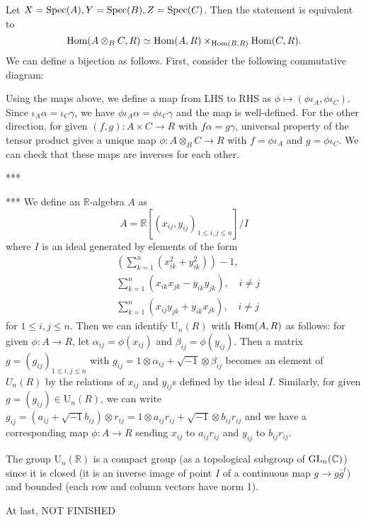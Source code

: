 \begin{problem}
Let $X = \operatorname{\mathrm{Spec}}(A), Y = \operatorname{\mathrm{Spec}}(B), Z = \operatorname{\mathrm{Spec}}(C)$. Then the statement is equivalent to
$$
    \operatorname{\mathrm{Hom}}(A \otimes_{B}C, R) \simeq \operatorname{\mathrm{Hom}}(A, R) \times_{\operatorname{\mathrm{Hom}}(B, R)} \operatorname{\mathrm{Hom}}(C, R).
$$
We can define a bijection as follows. First, consider the following commutative diagram:
\begin{center}
\end{center}
Using the maps above, we define a map from LHS to RHS as $\phi \mapsto (\phi \iota_{A}, \phi\iota_{C})$.
Since $\iota_{A}\alpha = \iota_{C}\gamma$, we have $\phi\iota_{A}\alpha = \phi\iota_{C}\gamma$ and the
map is well-defined.
For the other direction, for given $(f, g): A\times C \to R$ with $f\alpha = g \gamma$, universal property of the tensor product
gives a unique map $\phi: A\otimes_{B} C \to R$ with $f = \phi\iota_{A}$ and $g = \phi\iota_{C}$.
We can check that these maps are inverses for each other.
\end{problem}

\begin{problem} ***
\end{problem}

\begin{problem} ***
We define an $\mathbb{R}$-algebra $A$ as
$$
    A = \mathbb{R}[(x_{ij}, y_{ij})_{1 \leq i, j \leq n}] / I
$$
where $I$ is an ideal generated by elements of the form
\begin{align*}
    &\left(\sum_{k=1}^{n} (x_{ik}^{2} + y_{ik}^{2}) \right) - 1, \\
    &\sum_{k=1}^{n} (x_{ik}x_{jk} - y_{ik}y_{jk}), \quad i \neq j \\
    &\sum_{k=1}^{n} (x_{ij}y_{jk} + y_{ik}x_{jk}), \quad i \neq j
\end{align*}
for $1\leq i, j \leq n$.
Then we can identify $\mathrm{U}_{n}(R)$ with $\operatorname{\mathrm{Hom}}(A, R)$ as follows: for given $\phi : A \to R$,
let $\alpha_{ij} = \phi(x_{ij})$ and $\beta_{ij} = \phi(y_{ij})$.
Then a matrix $g = (g_{ij})_{1\leq i, j \leq n}$ with $g_{ij} = 1 \otimes \alpha_{ij} + \sqrt{-1} \otimes \beta_{ij}$ becomes an element
of $U_{n}(R)$ by the relations of $x_{ij}$ and $y_{ij}$s defined by the ideal $I$.
Similarly, for given $g = (g_{ij}) \in \mathrm{U}_{n}(R)$, we can write $g_{ij} = (a_{ij} + \sqrt{-1}b_{ij}) \otimes r_{ij} = 1 \otimes a_{ij}r_{ij} + \sqrt{-1} \otimes b_{ij}r_{ij}$
and we have a corresponding map $\phi : A \to R$ sending $x_{ij}$ to $a_{ij}r_{ij}$ and $y_{ij}$ to $b_{ij}r_{ij}$.

The group $\mathrm{U}_n(\mathbb{R})$ is a compact group (as a topological subgroup of $\operatorname{\mathrm{GL}}_{n}(\mathbb{C})$)
since it is closed (it is an inverse image of point $I$ of a continuous map $g \to g \overline{g}^{t}$) and bounded (each row and column vectors have norm 1).

At last, NOT FINISHED
\end{problem}

